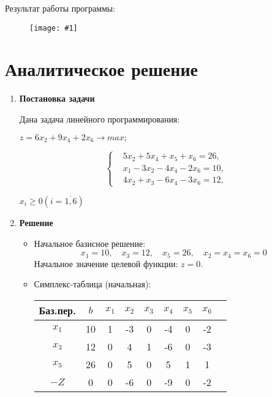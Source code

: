 \documentclass{report}
\newcommand{\drawzalupa}[2]{
	\begin{figure}[H]
		\centering
		\texttt{[image: \#1]}
	\end{figure}
}
\begin{document}
	Результат работы программы:
	
	\drawzalupa{images/task1.png}{1}
	
	\newpage
	
	\section{Аналитическое решение}
	
	\begin{enumerate}
		\item \textbf{Постановка задачи}
		
		Дана задача линейного программирования:
	\begin{center}
		$z = 6x_2 + 9x_4 + 2x_6 \rightarrow max;$
	\end{center}
	
	\[
	\left\{
	\begin{aligned}
		&5x_2 + 5x_4 + x_5 + x_6 = 26, \\
		&x_1 - 3x_2 - 4x_4 - 2x_6 = 10, \\
		&4x_2 + x_3 - 6x_4 - 3x_6 = 12,
	\end{aligned}
	\right.
	\]
	
	\begin{center}
		$x_i \geq 0 (i = \overline{1,6})$
	\end{center}
		
		\item \textbf{Решение}
		\begin{itemize}
			\item Начальное базисное решение:
			\[
			x_1 = 10,\quad x_3 = 12,\quad x_5 = 26,\quad x_2 = x_4 = x_6 = 0
			\]
			Начальное значение целевой функции: \( z = 0 \).
			
			\item Симплекс-таблица (начальная):
			\begin{center}
				\begin{tabular}{ccccccccc}
					\toprule
					Баз.пер. & $b$ & $x_1$ & $x_2$ & $x_3$ & $x_4$ & $x_5$ & $x_6$ \\
					\midrule
					$x_1$    & 10  & 1     & -3    & 0     & -4    & 0     & -2    \\
					$x_3$    & 12  & 0     & 4     & 1     & -6    & 0     & -3    \\
					$x_5$    & 26  & 0     & 5     & 0     & 5     & 1     & 1     \\
					$-Z$     & 0   & 0     & -6    & 0     & -9    & 0     & -2    \\
					\bottomrule
				\end{tabular}
			\end{center}
			

\end{itemize}
\end{enumerate}
\end{document}
